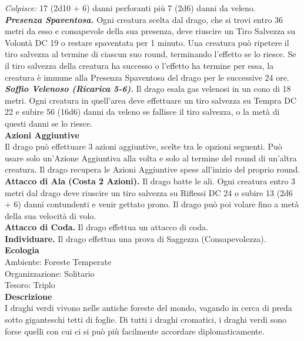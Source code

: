 \begin{multicols}{2}
\emph{Colpisce:} 17 (2d10 + 6) danni perforanti più 7 (2d6) danni da veleno.\\
\emph{\textbf{Presenza Spaventosa.}} Ogni creatura scelta dal drago, che si trovi entro 36 metri da esso e consapevole della sua presenza, deve riuscire un Tiro Salvezza su Volontà DC  19 o restare spaventata per 1 minuto. Una creatura può ripetere il tiro salvezza al termine di ciascun suo round, terminando l'effetto se lo riesce. Se il tiro salvezza della creatura ha successo o l'effetto ha termine per essa, la creatura è immune alla Presenza Spaventosa del drago per le successive 24 ore.\\
\emph{\textbf{Soffio Velenoso (Ricarica 5-6).}} Il drago esala gas velenosi in un cono di 18 metri. Ogni creatura in quell'area deve effettuare un tiro salvezza su Tempra DC  22 e subire 56 (16d6) danni da veleno se fallisce il tiro salvezza, o la metà di questi danni se lo riesce.\\
\textbf{Azioni Aggiuntive}\\
Il drago può effettuare 3 azioni aggiuntive, scelte tra le opzioni seguenti. Può usare solo un'Azione Aggiuntiva alla volta e solo al termine del round di un'altra creatura. Il drago recupera le Azioni Aggiuntive spese all'inizio del proprio round.
\textbf{Attacco di Ala (Costa 2 Azioni).} Il drago batte le ali. Ogni creatura entro 3 metri dal drago deve riuscire un tiro salvezza su Riflessi DC  24 o subire 13 (2d6 + 6) danni contundenti e venir gettato prono. Il drago può poi volare fino a metà della sua velocità di volo.\\
\textbf{Attacco di Coda.} Il drago effettua un attacco di coda.\\
\textbf{Individuare.} Il drago effettua una prova di Saggezza (Consapevolezza).\\
\textbf{Ecologia}\\
Ambiente: Foreste Temperate\\
Organizzazione: Solitario\\
Tesoro: Triplo\\
\textbf{Descrizione}\\
I draghi verdi vivono nelle antiche foreste del mondo, vagando in cerca di preda sotto giganteschi tetti di foglie. Di tutti i draghi cromatici, i draghi verdi sono forse quelli con cui ci si può più facilmente accordare diplomaticamente.\\


\end{multicols}
